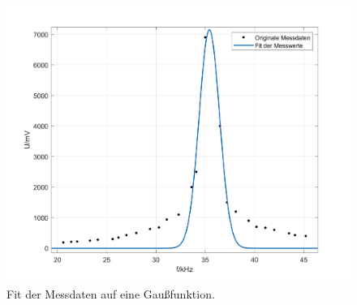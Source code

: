 \begin{figure}[H]
  \centering
  \includegraphics[width=12cm]{fit.png}
  \caption{Fit der Messdaten auf eine Gaußfunktion.}
\end{figure}

